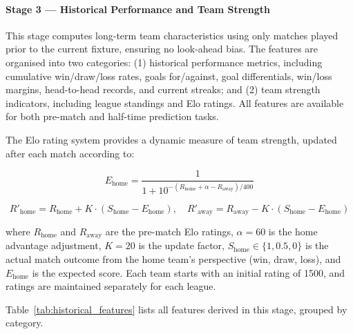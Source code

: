 \documentclass[pdflatex,sn-mathphys-num]{sn-jnl}
\theoremstyle{thmstyleone}
\theoremstyle{thmstyletwo}
\theoremstyle{thmstylethree}
\begin{document}
\paragraph{Stage 3 --- Historical Performance and Team Strength}\label{subsec:historical}

This stage computes long-term team characteristics using only matches played prior to the current fixture, ensuring no look-ahead bias. The features are organised into two categories: (1) historical performance metrics, including cumulative win/draw/loss rates, goals for/against, goal differentials, win/loss margins, head-to-head records, and current streaks; and (2) team strength indicators, including league standings and Elo ratings. All features are available for both pre-match and half-time prediction tasks.

The Elo rating system provides a dynamic measure of team strength, updated after each match according to:

\begin{equation}
E_{\text{home}} = \frac{1}{1 + 10^{-(R_{\text{home}} + \alpha - R_{\text{away}})/400}}
\label{eq:elo_expected}
\end{equation}

\begin{equation}
R'_{\text{home}} = R_{\text{home}} + K \cdot (S_{\text{home}} - E_{\text{home}}), \quad R'_{\text{away}} = R_{\text{away}} - K \cdot (S_{\text{home}} - E_{\text{home}})
\label{eq:elo_update}
\end{equation}

where $R_{\text{home}}$ and $R_{\text{away}}$ are the pre-match Elo ratings, $\alpha = 60$ is the home advantage adjustment, $K = 20$ is the update factor, $S_{\text{home}} \in \{1, 0.5, 0\}$ is the actual match outcome from the home team's perspective (win, draw, loss), and $E_{\text{home}}$ is the expected score. Each team starts with an initial rating of 1500, and ratings are maintained separately for each league.

Table~\ref{tab:historical_features} lists all features derived in this stage, grouped by category.
\end{document}
